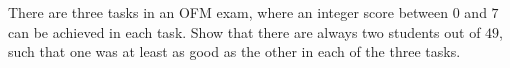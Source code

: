 There are three tasks in an OFM exam, where an integer score between $0$ and $7$ can be achieved in each task. Show that there are always two students out of $49$, such that one was at least as good as the other in each of the three tasks.